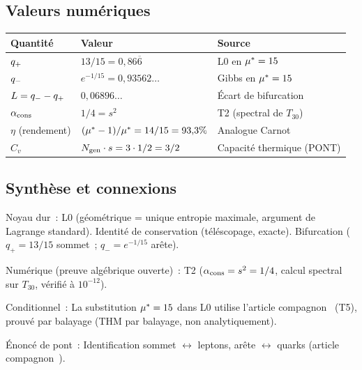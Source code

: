 \documentclass[12pt,a4paper]{article}
\begin{document}
\subsection{Valeurs numériques}
\label{sec:ch3_numerics}

\begin{center}
\begin{tabular}{lll}
\toprule
\textbf{Quantité} & \textbf{Valeur} & \textbf{Source} \\
\midrule
$q_{+}$ & $13/15 = 0{,}86\overline{6}$ & L0 en ${\mu^{*}} = 15$ \\
$q_{-}$ & $e^{-1/15} = 0{,}93562\ldots$ & Gibbs en ${\mu^{*}} = 15$ \\
$L = q_{-} - q_{+}$ & $0{,}06896\ldots$ & Écart de bifurcation \\
$\alpha_{\rm cons}$ & $1/4 = s^2$ & T2 (spectral de $T_{30}$) \\
$\eta$ (rendement) & $({\mu^{*}} - 1)/{\mu^{*}} = 14/15 = 93{,}3\%$ & Analogue Carnot \\
$C_v$ & $N_{\rm gen} \cdot s = 3 \cdot 1/2 = 3/2$ & Capacité thermique (PONT) \\
\bottomrule
\end{tabular}
\end{center}

\subsection{Synthèse et connexions}
\label{sec:ch3_summary}

\begin{ledgerbox}
Noyau dur~:
  L0 (géométrique = unique entropie maximale, argument de Lagrange
  standard).
  Identité de conservation (téléscopage, exacte).
  Bifurcation ($q_+ = 13/15$ sommet~; $q_- = e^{-1/15}$ arête).

Numérique (preuve algébrique ouverte)~:
  T2 ($\alpha_{\rm cons} = s^2 = 1/4$, calcul spectral sur $T_{30}$,
  vérifié à $10^{-12}$).

Conditionnel~:
  La substitution ${\mu^{*}} = 15$ dans L0 utilise l'article
  compagnon~\cite{companion_M3} (T5), prouvé par balayage (THM par
  balayage, non analytiquement).

Énoncé de pont~:
  Identification sommet $\leftrightarrow$ leptons,
  arête $\leftrightarrow$ quarks (article
  compagnon~\cite{companion_M5}).
\end{ledgerbox}
\end{document}

